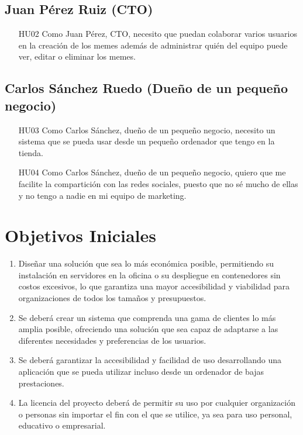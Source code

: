     \subsection{Juan Pérez Ruiz (CTO)}

        \begin{enumerate}
            \item [HU02] Como Juan Pérez, CTO, necesito que puedan colaborar varios usuarios en la creación de los memes además de administrar quién del equipo puede ver, editar o eliminar los memes.
        \end{enumerate}

    \subsection{Carlos Sánchez Ruedo (Dueño de un pequeño negocio)}

        \begin{enumerate}
            \item [HU03] Como Carlos Sánchez, dueño de un pequeño negocio, necesito un sistema que se pueda usar desde un pequeño ordenador que tengo en la tienda.
            \item [HU04] Como Carlos Sánchez, dueño de un pequeño negocio, quiero que me facilite la compartición con las redes sociales, puesto que no sé mucho de ellas y no tengo a nadie en mi equipo de marketing.
        \end{enumerate}

\section{Objetivos Iniciales}

\begin{enumerate}
    \item Diseñar una solución que sea lo más económica posible, permitiendo su instalación en servidores en la oficina o su despliegue en contenedores sin costos excesivos, lo que garantiza una mayor accesibilidad y viabilidad para organizaciones de todos los tamaños y presupuestos.
    \item Se deberá crear un sistema que comprenda una gama de clientes lo más amplia posible, ofreciendo una solución que sea capaz de adaptarse a las diferentes necesidades y preferencias de los usuarios.
    \item Se deberá garantizar la accesibilidad y facilidad de uso desarrollando una aplicación que se pueda utilizar incluso desde un ordenador de bajas prestaciones.
    \item La licencia del proyecto deberá de permitir su uso por cualquier organización o personas sin importar el fin con el que se utilice, ya sea para uso personal, educativo o empresarial.
\end{enumerate}
